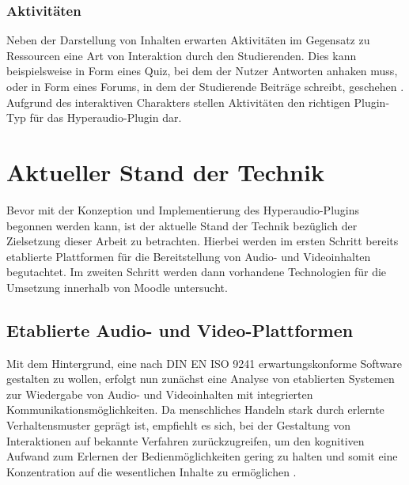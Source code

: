 \subsubsection{Aktivitäten}
Neben der Darstellung von Inhalten erwarten Aktivitäten im Gegensatz zu Ressourcen eine Art von Interaktion durch den Studierenden. Dies kann beispielsweise in Form eines Quiz, bei dem der Nutzer Antworten anhaken muss, oder in Form eines Forums, in dem der Studierende Beiträge schreibt, geschehen \citep{wild2017moodle}. Aufgrund des interaktiven Charakters stellen Aktivitäten den richtigen Plugin-Typ für das Hyperaudio-Plugin dar.


\section{Aktueller Stand der Technik}
\label{sec:Technik}
Bevor mit der Konzeption und Implementierung des Hyperaudio-Plugins begonnen werden kann, ist der aktuelle Stand der Technik bezüglich der Zielsetzung dieser Arbeit zu betrachten. Hierbei werden im ersten Schritt bereits etablierte Plattformen für die Bereitstellung von Audio- und Videoinhalten begutachtet. Im zweiten Schritt werden dann vorhandene Technologien für die Umsetzung innerhalb von Moodle untersucht.


\subsection{Etablierte Audio- und Video-Plattformen}

Mit dem Hintergrund, eine nach DIN EN ISO 9241 erwartungskonforme Software gestalten zu wollen, erfolgt nun zunächst eine Analyse von etablierten Systemen zur Wiedergabe von Audio- und Videoinhalten mit integrierten Kommunikationsmöglichkeiten. Da menschliches Handeln stark durch erlernte Verhaltensmuster geprägt ist, empfiehlt es sich, bei der Gestaltung von Interaktionen auf bekannte Verfahren zurückzugreifen, um den kognitiven Aufwand zum Erlernen der Bedienmöglichkeiten gering zu halten und somit eine Konzentration auf die wesentlichen Inhalte zu ermöglichen \citep{erwartungskonformitaet}.


